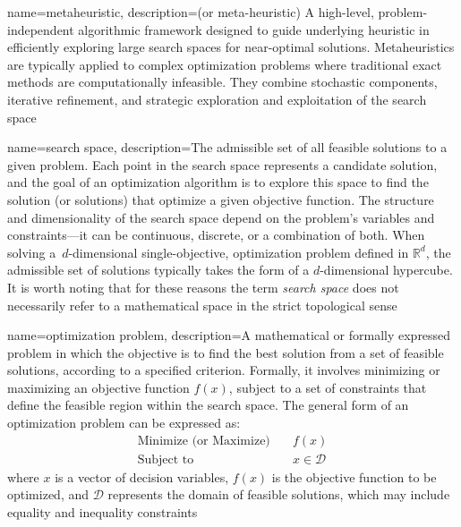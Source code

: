 {
    name=metaheuristic,
    description={(or meta-heuristic) A high-level, problem-independent algorithmic framework designed to guide underlying heuristic in efficiently exploring large search spaces for near-optimal solutions. Metaheuristics are typically applied to complex optimization problems where traditional exact methods are computationally infeasible. They combine stochastic components, iterative refinement, and strategic exploration and exploitation of the search space}
}

{
    name=search space,
    description={The admissible set of all feasible solutions to a given problem. Each point in the search space represents a candidate solution, and the goal of an optimization algorithm is to explore this space to find the solution (or solutions) that optimize a given objective function. The structure and dimensionality of the search space depend on the problem's variables and constraints---it can be continuous, discrete, or a combination of both. When solving a~\mbox{$d$-dimensional} single-objective, optimization problem defined in $\mathbb{R}^{d}$, the admissible set of solutions typically takes the form of a $d$-dimensional hypercube. It is worth noting that for these reasons the term \textit{search space} does not necessarily refer to a mathematical space in the strict topological sense}
}

{
    name=optimization problem,
    description={A mathematical or formally expressed problem in which the objective is to find the best solution from a set of feasible solutions, according to a specified criterion. Formally, it involves minimizing or maximizing an objective function $f(x)$, subject to a set of constraints that define the feasible region within the search space. The general form of an optimization problem can be expressed as:%
$$
\begin{aligned}
\text{Minimize (or Maximize)} \quad & f(x) \\
\text{Subject to} \quad & x \in \mathcal{D}
\end{aligned}
$$
where $x$ is a vector of decision variables, $f(x)$ is the objective function to be optimized, and $\mathcal{D}$ represents the domain of feasible solutions, which may include equality and inequality constraints}
}
